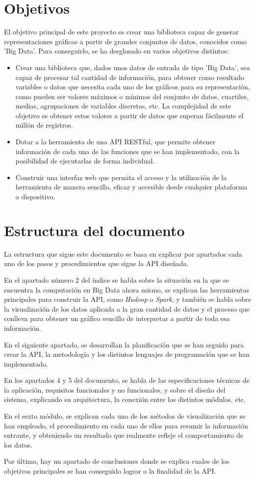 \section{Objetivos}
El objetivo principal de este proyecto es crear una biblioteca capaz de generar representaciones gráficas a partir de grandes conjuntos de datos, conocidos como 'Big Data'. Para conseguirlo, se ha desglosado en varios objetivos distintos:
\begin{itemize}
	\item Crear una biblioteca que, dados unos datos de entrada de tipo 'Big Data', sea capaz de procesar tal cantidad de información, para obtener como resultado variables o datos que necesita cada uno de los gráficos para su representación, como pueden ser valores máximos o mínimos del conjunto de datos, cuartiles, medias, agrupaciones de variables discretas, etc. La complejidad de este objetivo es obtener estos valores a partir de datos que superan fácilmente el millón de registros.
	\item Dotar a la herramienta de una API RESTful, que permite obtener información de cada una de las funciones que se han implementado, con la posibilidad de ejecutarlas de forma individual.
	\item Construir una interfaz web que permita el acceso y la utilización de la herramienta de manera sencilla, eficaz y accesible desde cualquier plataforma o dispositivo.
\end{itemize}

\section{Estructura del documento}

La estructura que sigue este documento se basa en explicar por apartados cada uno de los pasos y procedimientos que sigue la API diseñada. 

En el apartado número 2 del índice se habla sobre la situación en la que se encuentra la computación en Big Data ahora mismo, se explican las herramientas principales para construir la API, como \textit{Hadoop} o \textit{Spark}, y también se habla sobre la visualización de los datos aplicada a la gran cantidad de datos y el proceso que conlleva para obtener un gráfico sencillo de interpretar a partir de toda esa información. 

En el siguiente apartado, se desarrollan la planificación que se han seguido para crear la API, la metodología y los distintos lenguajes de programación que se han implementado.

En los apartados 4 y 5 del documento, se habla de las especificaciones técnicas de la aplicación, requisitos funcionales y no funcionales, y sobre el diseño del sistema, explicando su arquitectura, la conexión entre los distintos módulos, etc.

En el sexto módulo, se explican cada uno de los métodos de visualización que se han empleado, el procedimiento en cada uno de ellos para resumir la información entrante, y obteniendo un resultado que realmente refleje el comportamiento de los datos.

Por último, hay un apartado de conclusiones donde se explica cuales de los objetivos principales se han conseguido lograr o la finalidad de la API.
